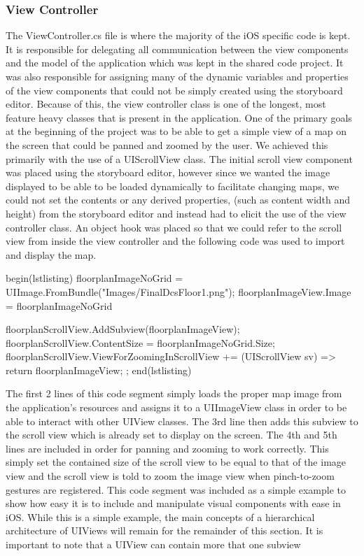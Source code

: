 \documentclass[main.tex]{subfiles}
\begin{document}
\subsubsection{View Controller}
The ViewController.cs file is where the majority of the iOS specific code is kept. It is responsible for delegating all communication between the view components and the model of the application which was kept in the shared code project. It was also responsible for assigning many of the dynamic variables and properties of the view components that could not be simply created using the storyboard editor. Because of this, the view controller class is one of the longest, most feature heavy classes that is present in the application. One of the primary goals at the beginning of the project was to be able to get a simple view of a map on the screen that could be panned and zoomed by the user. We achieved this primarily with the use of a UIScrollView class. The initial scroll view component was placed using the storyboard editor, however since we wanted the image displayed to be able to be loaded dynamically to facilitate changing maps, we could not set the contents or any derived properties, (such as content width and height) from the storyboard editor and instead had to elicit the use of the view controller class. An object hook was placed so that we could refer to the scroll view from inside the view controller and the following code was used to import and display the map.

begin(lstlisting)
floorplanImageNoGrid = UIImage.FromBundle("Images/FinalDcsFloor1.png");
floorplanImageView.Image = floorplanImageNoGrid

floorplanScrollView.AddSubview(floorplanImageView);
floorplanScrollView.ContentSize = floorplanImageNoGrid.Size;
floorplanScrollView.ViewForZoomingInScrollView += (UIScrollView sv) => { return floorplanImageView; };
end(lstlisting) 

The first 2 lines of this code segment simply loads the proper map image from the application's resources and assigns it to a UIImageView class in order to be able to interact with other UIView classes. The 3rd line then adds this subview to the scroll view which is already set to display on the screen. The 4th and 5th lines are included in order for panning and zooming to work correctly. This simply set the contained size of the scroll view to be equal to that of the image view and the scroll view is told to zoom the image view when pinch-to-zoom gestures are registered. This code segment was included as a simple example to show how easy it is to include and manipulate visual components with ease in iOS. While this is a simple example, the main concepts of a hierarchical architecture of UIViews will remain for the remainder of this section. It is important to note that a UIView can contain more that one subview
\end{document}
